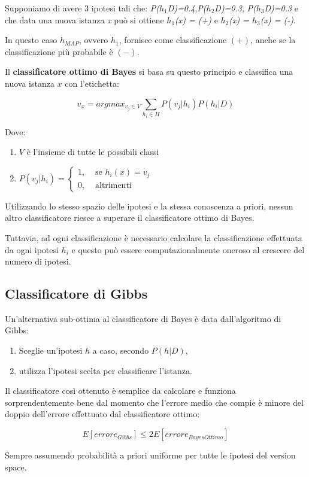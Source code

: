 Supponiamo di avere 3 ipotesi tali che: \emph{P($h_1$\textbar{}D)=0.4},\emph{P($h_2$\textbar{}D)=0.3},
\emph{P($h_3$\textbar{}D)=0.3} e che data una nuova istanza \emph{x} può si ottiene \emph{$h_1$(x) = (+)} e \emph{$h_2$(x) = $h_3$(x) = (-)}. 

In questo caso $h_{MAP}$, ovvero $h_1$, fornisce come classificazione $(+)$, anche se la classificazione più probabile è $(-)$.

Il \textbf{classificatore ottimo di Bayes} si basa su questo principio e classifica una nuova istanza $x$ con l'etichetta:

$$
v_x = argmax_{v_j \in V} \sum\limits_{h_i \in H} P(v_j | h_i)P(h_i | D)
$$

Dove:

\begin{enumerate}
\item $V$ è l'insieme di tutte le possibili classi
\item $
P(v_j | h_i) = 
	\begin{cases}
		1,& \text{ se } h_i(x) = v_j \\
		0,& \text{ altrimenti }
	\end{cases}
$
\end{enumerate}

Utilizzando lo stesso spazio delle ipotesi e la stessa conoscenza a priori, nessun altro classificatore riesce a superare il classificatore ottimo di Bayes.

Tuttavia, ad ogni classificazione è necessario calcolare la classificazione effettuata da ogni ipotesi $h_i$ e questo può essere computazionalmente oneroso al crescere del numero di ipotesi.

\subsection{Classificatore di Gibbs}\label{classificazione-di-gibbs}

Un'alternativa sub-ottima al classificatore di Bayes è data dall'algoritmo di Gibbs:

\begin{enumerate}
\item Sceglie un'ipotesi $h$ a caso, secondo $P(h|D)$,
\item utilizza l'ipotesi scelta per classificare l'istanza.
\end{enumerate}

Il classificatore così ottenuto è semplice da calcolare e funziona sorprendentemente bene dal momento che l'errore medio che compie è minore del doppio dell'errore effettuato dal classificatore ottimo:

$$
E[errore_{Gibbs}] \leq 2E[errore_{BayesOttimo}]
$$

Sempre assumendo probabilità a priori uniforme per tutte le ipotesi del version space.